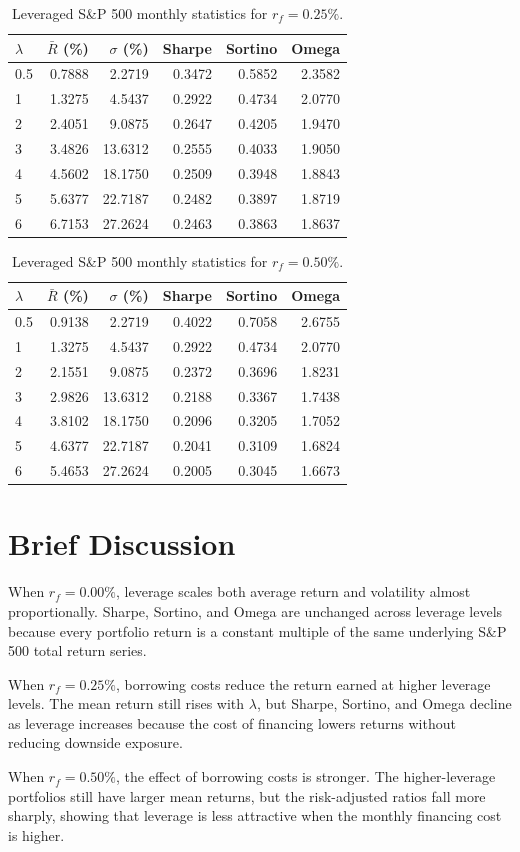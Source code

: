 \documentclass[11pt]{article}
\begin{document}
\begin{table}[H]
\centering
\caption{Leveraged S\&P 500 monthly statistics for $r_f=0.25\%$.}
\label{tab:rf-25}
\begin{tabular}{lrrrrr}
\toprule
$\lambda$ & $\bar{R}$ (\%) & $\sigma$ (\%) & Sharpe & Sortino & Omega \\
\midrule
0.5 & 0.7888 & 2.2719 & 0.3472 & 0.5852 & 2.3582 \\
1 & 1.3275 & 4.5437 & 0.2922 & 0.4734 & 2.0770 \\
2 & 2.4051 & 9.0875 & 0.2647 & 0.4205 & 1.9470 \\
3 & 3.4826 & 13.6312 & 0.2555 & 0.4033 & 1.9050 \\
4 & 4.5602 & 18.1750 & 0.2509 & 0.3948 & 1.8843 \\
5 & 5.6377 & 22.7187 & 0.2482 & 0.3897 & 1.8719 \\
6 & 6.7153 & 27.2624 & 0.2463 & 0.3863 & 1.8637 \\
\bottomrule
\end{tabular}
\end{table}

\begin{table}[H]
\centering
\caption{Leveraged S\&P 500 monthly statistics for $r_f=0.50\%$.}
\label{tab:rf-50}
\begin{tabular}{lrrrrr}
\toprule
$\lambda$ & $\bar{R}$ (\%) & $\sigma$ (\%) & Sharpe & Sortino & Omega \\
\midrule
0.5 & 0.9138 & 2.2719 & 0.4022 & 0.7058 & 2.6755 \\
1 & 1.3275 & 4.5437 & 0.2922 & 0.4734 & 2.0770 \\
2 & 2.1551 & 9.0875 & 0.2372 & 0.3696 & 1.8231 \\
3 & 2.9826 & 13.6312 & 0.2188 & 0.3367 & 1.7438 \\
4 & 3.8102 & 18.1750 & 0.2096 & 0.3205 & 1.7052 \\
5 & 4.6377 & 22.7187 & 0.2041 & 0.3109 & 1.6824 \\
6 & 5.4653 & 27.2624 & 0.2005 & 0.3045 & 1.6673 \\
\bottomrule
\end{tabular}
\end{table}

\section*{Brief Discussion}
When $r_f=0.00\%$, leverage scales both average return and volatility almost proportionally.
Sharpe, Sortino, and Omega are unchanged across leverage levels because every portfolio return is a constant multiple of the same underlying S\&P 500 total return series.

When $r_f=0.25\%$, borrowing costs reduce the return earned at higher leverage levels.
The mean return still rises with $\lambda$, but Sharpe, Sortino, and Omega decline as leverage increases because the cost of financing lowers returns without reducing downside exposure.

When $r_f=0.50\%$, the effect of borrowing costs is stronger.
The higher-leverage portfolios still have larger mean returns, but the risk-adjusted ratios fall more sharply, showing that leverage is less attractive when the monthly financing cost is higher.
\end{document}
